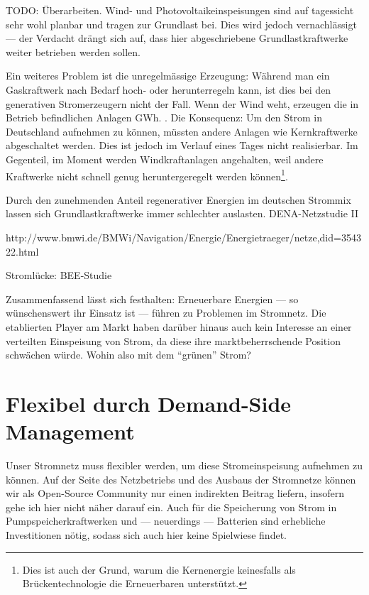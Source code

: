 \documentclass[12pt,BCOR=8.5mm]{scrartcl}
\begin{document}


TODO: Überarbeiten. Wind- und Photovoltaikeinspeisungen sind auf
tagessicht sehr wohl planbar und tragen zur Grundlast bei. Dies wird
jedoch vernachlässigt --- der Verdacht drängt sich auf, dass hier
abgeschriebene Grundlastkraftwerke weiter betrieben werden sollen.

Ein weiteres Problem ist die unregelmässige Erzeugung: Während man ein
Gaskraftwerk nach Bedarf hoch- oder herunterregeln kann, ist dies bei
den generativen Stromerzeugern nicht der Fall. Wenn der Wind weht,
erzeugen die in Betrieb befindlichen Anlagen 
GWh. . Die Konsequenz: Um den
Strom in Deutschland aufnehmen zu können, müssten andere Anlagen wie
Kernkraftwerke abgeschaltet werden. Dies ist jedoch im Verlauf eines
Tages nicht realisierbar. Im Gegenteil, im Moment werden
Windkraftanlagen angehalten, weil andere Kraftwerke nicht schnell genug
heruntergeregelt werden können\footnote{Dies ist auch der Grund, warum die
Kernenergie keinesfalls als Brückentechnologie die Erneuerbaren
unterstützt.}. 

Durch den zunehmenden Anteil regenerativer Energien im deutschen Strommix lassen sich Grundlastkraftwerke immer schlechter auslasten.
DENA-Netzstudie II

http://www.bmwi.de/BMWi/Navigation/Energie/Energietraeger/netze,did=354322.html

Stromlücke: BEE-Studie


Zusammenfassend lässt sich festhalten: Erneuerbare Energien --- so
wünschenswert ihr Einsatz ist --- führen zu Problemen im Stromnetz. Die
etablierten Player am Markt haben darüber hinaus auch kein Interesse an
einer verteilten Einspeisung von Strom, da diese ihre marktbeherrschende
Position schwächen würde. Wohin also mit dem "`grünen"' Strom?

\section{Flexibel durch Demand-Side Management}\label{sec:demand-side_management}

Unser Stromnetz muss flexibler werden, um diese Stromeinspeisung
aufnehmen zu können. Auf der Seite des Netzbetriebs und des Ausbaus der
Stromnetze können wir als Open-Source Community nur einen indirekten
Beitrag liefern, insofern gehe ich hier nicht näher darauf ein. Auch für
die Speicherung von Strom in Pumpspeicherkraftwerken und --- neuerdings
--- Batterien sind erhebliche Investitionen nötig, sodass sich auch hier
keine Spielwiese findet.
\end{document}
